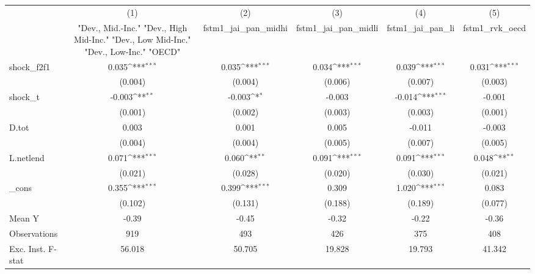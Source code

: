 {
\def\sym#1{\ifmmode^{#1}\else\(^{#1}\)\fi}
\begin{tabular}{l*{5}{c}}
\toprule
            &\multicolumn{1}{c}{(1)}&\multicolumn{1}{c}{(2)}&\multicolumn{1}{c}{(3)}&\multicolumn{1}{c}{(4)}&\multicolumn{1}{c}{(5)}\\
            &\multicolumn{1}{c}{ "Dev., Mid.-Inc." "Dev., High Mid-Inc." "Dev., Low Mid-Inc." "Dev., Low-Inc." "OECD" }&\multicolumn{1}{c}{fstm1\_jai\_pan\_midhi}&\multicolumn{1}{c}{fstm1\_jai\_pan\_midli}&\multicolumn{1}{c}{fstm1\_jai\_pan\_li}&\multicolumn{1}{c}{fstm1\_rvk\_oecd}\\
\midrule
shock\_f2f1  &       0.035\sym{***}&       0.035\sym{***}&       0.034\sym{***}&       0.039\sym{***}&       0.031\sym{***}\\
            &     (0.004)         &     (0.004)         &     (0.006)         &     (0.007)         &     (0.003)         \\
\addlinespace
shock\_t     &      -0.003\sym{**} &      -0.003\sym{*}  &      -0.003         &      -0.014\sym{***}&      -0.001         \\
            &     (0.001)         &     (0.002)         &     (0.003)         &     (0.003)         &     (0.001)         \\
\addlinespace
D.tot       &       0.003         &       0.001         &       0.005         &      -0.011         &      -0.003         \\
            &     (0.004)         &     (0.004)         &     (0.005)         &     (0.007)         &     (0.005)         \\
\addlinespace
L.netlend   &       0.071\sym{***}&       0.060\sym{**} &       0.091\sym{***}&       0.091\sym{***}&       0.048\sym{**} \\
            &     (0.021)         &     (0.028)         &     (0.020)         &     (0.030)         &     (0.021)         \\
\addlinespace
\_cons      &       0.355\sym{***}&       0.399\sym{***}&       0.309         &       1.020\sym{***}&       0.083         \\
            &     (0.102)         &     (0.131)         &     (0.188)         &     (0.189)         &     (0.077)         \\
\midrule
Mean Y      &       -0.39         &       -0.45         &       -0.32         &       -0.22         &       -0.36         \\
Observations&         919         &         493         &         426         &         375         &         408         \\
Exc. Inst. F-stat&      56.018         &      50.705         &      19.828         &      19.793         &      41.342         \\
\bottomrule
\end{tabular}
}

